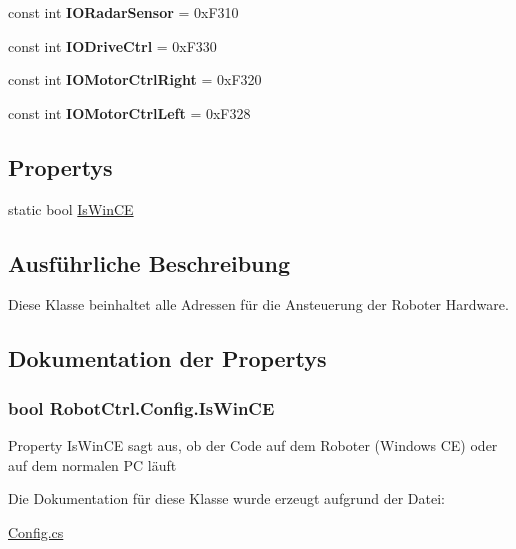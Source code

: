 \begin{DoxyCompactItemize}
\item 
\hypertarget{class_robot_ctrl_1_1_config_a5ec60e0aa55a87f197bf88cfca362f4c}{
const int {\bfseries IORadarSensor} = 0xF310}
\label{class_robot_ctrl_1_1_config_a5ec60e0aa55a87f197bf88cfca362f4c}

\item 
\hypertarget{class_robot_ctrl_1_1_config_a64fd0db1d0bcb248ab20b1511507bd10}{
const int {\bfseries IODriveCtrl} = 0xF330}
\label{class_robot_ctrl_1_1_config_a64fd0db1d0bcb248ab20b1511507bd10}

\item 
\hypertarget{class_robot_ctrl_1_1_config_aa3e15e92eb2fe300cd20690de0ed0d11}{
const int {\bfseries IOMotorCtrlRight} = 0xF320}
\label{class_robot_ctrl_1_1_config_aa3e15e92eb2fe300cd20690de0ed0d11}

\item 
\hypertarget{class_robot_ctrl_1_1_config_aa1d6da7ec6a2d563c8faec2663e50350}{
const int {\bfseries IOMotorCtrlLeft} = 0xF328}
\label{class_robot_ctrl_1_1_config_aa1d6da7ec6a2d563c8faec2663e50350}

\end{DoxyCompactItemize}
\subsection*{Propertys}
\begin{DoxyCompactItemize}
\item 
static bool \hyperlink{class_robot_ctrl_1_1_config_ab60bbdfe5e8dfff6ff29e22b64a120f5}{IsWinCE}
\end{DoxyCompactItemize}


\subsection{Ausführliche Beschreibung}
Diese Klasse beinhaltet alle Adressen f\"{u}r die Ansteuerung der Roboter Hardware. 

\subsection{Dokumentation der Propertys}
\hypertarget{class_robot_ctrl_1_1_config_ab60bbdfe5e8dfff6ff29e22b64a120f5}{
\subsubsection[{IsWinCE}]{\setlength{\rightskip}{0pt plus 5cm}bool RobotCtrl.Config.IsWinCE}}
\label{class_robot_ctrl_1_1_config_ab60bbdfe5e8dfff6ff29e22b64a120f5}
Property IsWinCE sagt aus, ob der Code auf dem Roboter (Windows CE) oder auf dem normalen PC l\"{a}uft 

Die Dokumentation für diese Klasse wurde erzeugt aufgrund der Datei:\begin{DoxyCompactItemize}
\item 
\hyperlink{_config_8cs}{Config.cs}\end{DoxyCompactItemize}
